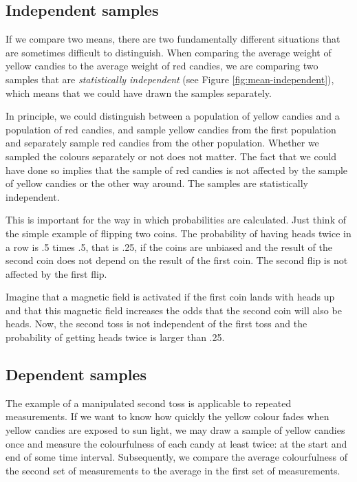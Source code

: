\documentclass[a4paper]{book}
\theoremstyle{definition}
\theoremstyle{definition}
\theoremstyle{definition}
\theoremstyle{remark}
\begin{document}
\subsection{Independent samples}\label{independent-samples}

If we compare two means, there are two fundamentally different
situations that are sometimes difficult to distinguish. When comparing
the average weight of yellow candies to the average weight of red
candies, we are comparing two samples that are \emph{statistically
independent} (see Figure \ref{fig:mean-independent}), which means that
we could have drawn the samples separately.

In principle, we could distinguish between a population of yellow
candies and a population of red candies, and sample yellow candies from
the first population and separately sample red candies from the other
population. Whether we sampled the colours separately or not does not
matter. The fact that we could have done so implies that the sample of
red candies is not affected by the sample of yellow candies or the other
way around. The samples are statistically independent.

This is important for the way in which probabilities are calculated.
Just think of the simple example of flipping two coins. The probability
of having heads twice in a row is .5 times .5, that is .25, if the coins
are unbiased and the result of the second coin does not depend on the
result of the first coin. The second flip is not affected by the first
flip.

Imagine that a magnetic field is activated if the first coin lands with
heads up and that this magnetic field increases the odds that the second
coin will also be heads. Now, the second toss is not independent of the
first toss and the probability of getting heads twice is larger than
.25.

\subsection{Dependent samples}\label{dependentsamples}

The example of a manipulated second toss is applicable to repeated
measurements. If we want to know how quickly the yellow colour fades
when yellow candies are exposed to sun light, we may draw a sample of
yellow candies once and measure the colourfulness of each candy at least
twice: at the start and end of some time interval. Subsequently, we
compare the average colourfulness of the second set of measurements to
the average in the first set of measurements.
\end{document}

